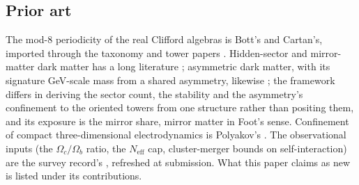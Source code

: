 \documentclass[11pt]{article}
\theoremstyle{definition}
\theoremstyle{plain}
\providecommand{\Neff}{}\renewcommand{\Neff}{N_{\mathrm{eff}}}
\begin{document}
\subsection*{Prior art}
\label{c:note.dark-matter.setting-prior-art}
The mod-8 periodicity of the real Clifford algebras is Bott's and Cartan's, imported through the taxonomy and tower papers \cite{ButlerT1, ButlerT3}. Hidden-sector and mirror-matter dark matter has a long literature \cite{FootMirror2004}; asymmetric dark matter, with its signature GeV-scale mass from a shared asymmetry, likewise \cite{Zurek2014}; the framework differs in deriving the sector count, the stability and the asymmetry's confinement to the oriented towers from one structure rather than positing them, and its exposure is the mirror share, mirror matter in Foot's sense. Confinement of compact three-dimensional electrodynamics is Polyakov's \cite{Polyakov1977}. The observational inputs (the $\Omega_{c}/\Omega_{b}$ ratio, the $\Neff$ cap, cluster-merger bounds on self-interaction) are the survey record's \cite{Planck2018, Clowe2006}, refreshed at submission. What this paper claims as new is listed under its contributions.
\end{document}
